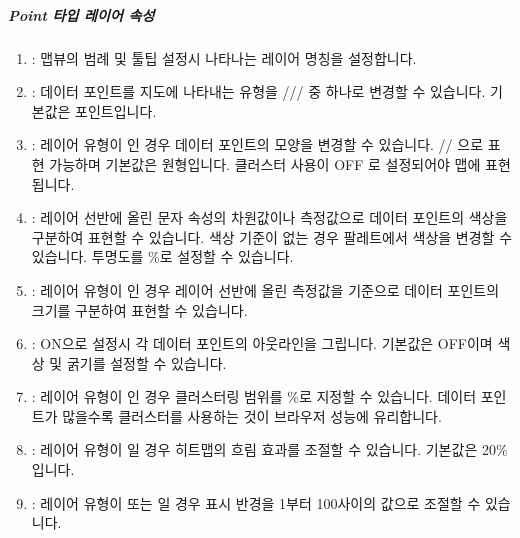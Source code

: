 \documentclass[letterpaper,10pt,english]{sphinxmanual}
\begin{document}
\subparagraph{Point 타입 레이어 속성}
\label{\detokenize{discovery/part04/map_chart:point}}\begin{quote}

\begin{figure}[H]
\centering

\noindent{}
\end{figure}
\end{quote}
\begin{enumerate}
\def\theenumi{\arabic{enumi}}
\def\labelenumi{\theenumi .}
\makeatletter\def\p@enumii{\p@enumi \theenumi .}\makeatother
\item {} 
: 맵뷰의 범례 및 툴팁 설정시 나타나는 레이어 명칭을 설정합니다.

\item {} 
: 데이터 포인트를 지도에 나타내는 유형을 /// 중 하나로 변경할 수 있습니다. 기본값은 포인트입니다.

\item {} 
: 레이어 유형이  인 경우 데이터 포인트의 모양을 변경할 수 있습니다. // 으로 표현 가능하며 기본값은 원형입니다. 클러스터 사용이 OFF 로 설정되어야 맵에 표현됩니다.

\item {} 
: 레이어 선반에 올린 문자 속성의 차원값이나 측정값으로 데이터 포인트의 색상을 구분하여 표현할 수 있습니다. 색상 기준이 없는 경우 팔레트에서 색상을 변경할 수 있습니다. 투명도를 \%로 설정할 수 있습니다.

\item {} 
: 레이어 유형이  인 경우 레이어 선반에 올린 측정값을 기준으로 데이터 포인트의 크기를 구분하여 표현할 수 있습니다.

\item {} 
: ON으로 설정시 각 데이터 포인트의 아웃라인을 그립니다. 기본값은 OFF이며 색상 및 굵기를 설정할 수 있습니다.

\item {} 
: 레이어 유형이  인 경우 클러스터링 범위를 \%로 지정할 수 있습니다. 데이터 포인트가 많을수록 클러스터를 사용하는 것이 브라우저 성능에 유리합니다.

\item {} 
: 레이어 유형이  일 경우 히트맵의 흐림 효과를 조절할 수 있습니다. 기본값은 20\%입니다.

\item {} 
: 레이어 유형이  또는  일 경우 표시 반경을 1부터 100사이의 값으로 조절할 수 있습니다.

\end{enumerate}
\end{document}
